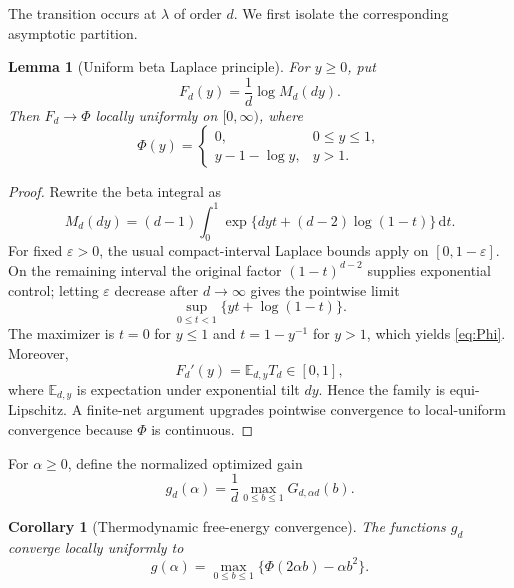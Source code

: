 \documentclass[11pt,a4paper]{article}
\newtheorem{lemma}[theorem]{Lemma}
\newtheorem{corollary}[theorem]{Corollary}
\theoremstyle{remark}
\newcommand{\E}{\mathbb{E}}
\newcommand{\dd}{\,\mathrm{d}}
\begin{document}
The transition occurs at $\lambda$ of order $d$.  We first isolate the
corresponding asymptotic partition.

\begin{lemma}[Uniform beta Laplace principle]
\label{lem:laplace}
For $y\ge0$, put
\begin{equation}
 F_d(y)=\frac1d\log M_d(dy).
\end{equation}
Then $F_d\to\Phi$ locally uniformly on $[0,\infty)$, where
\begin{equation}
 \Phi(y)=
 \begin{cases}
 0,&0\le y\le1,\\
 y-1-\log y,&y>1.
 \end{cases}
 \label{eq:Phi}
\end{equation}
\end{lemma}

\begin{proof}
Rewrite the beta integral as
\begin{equation}
  M_d(dy)=(d-1)\int_0^1
  \exp\{dyt+(d-2)\log(1-t)\}\dd t.
\end{equation}
For fixed $\varepsilon>0$, the usual compact-interval Laplace bounds apply on
$[0,1-\varepsilon]$.  On the remaining interval the original factor
$(1-t)^{d-2}$ supplies exponential control; letting $\varepsilon$ decrease
after $d\to\infty$ gives the pointwise limit
\begin{equation}
 \sup_{0\le t<1}\{yt+\log(1-t)\}.
\end{equation}
The maximizer is $t=0$ for $y\le1$ and $t=1-y^{-1}$ for $y>1$, which yields
\eqref{eq:Phi}.  Moreover,
\begin{equation}
 F_d'(y)=\E_{d,y}T_d\in[0,1],
\end{equation}
where $\E_{d,y}$ is expectation under exponential tilt $dy$.  Hence the
family is equi-Lipschitz.  A finite-net argument upgrades pointwise
convergence to local-uniform convergence because $\Phi$ is continuous.
\end{proof}

For $\alpha\ge0$, define the normalized optimized gain
\begin{equation}
 g_d(\alpha)=\frac1d\max_{0\le b\le1}G_{d,\alpha d}(b).
 \label{eq:gd}
\end{equation}

\begin{corollary}[Thermodynamic free-energy convergence]
\label{cor:gd}
The functions $g_d$ converge locally uniformly to
\begin{equation}
 g(\alpha)=\max_{0\le b\le1}
 \{\Phi(2\alpha b)-\alpha b^2\}.
 \label{eq:g-limit}
\end{equation}
\end{corollary}
\end{document}

